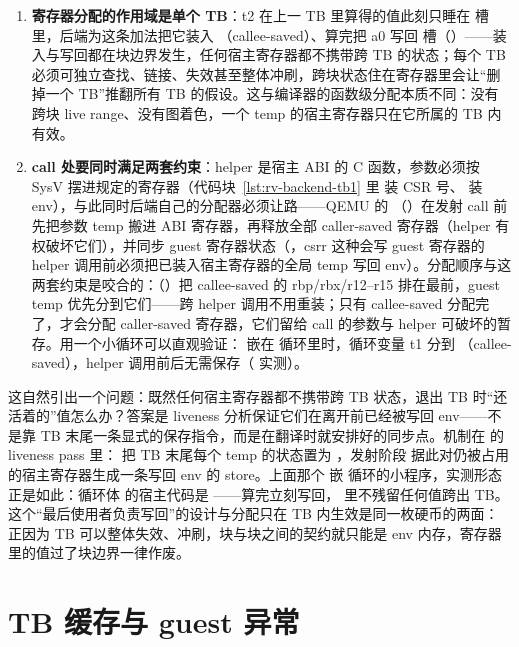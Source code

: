 \begin{enumerate}[label=\arabic*.,leftmargin=2.5em,itemsep=2pt]
\item \textbf{寄存器分配的作用域是单个 TB}：t2 在上一 TB 里算得的值此刻只睡在  槽里，后端为这条加法把它装入 （callee-saved）、算完把 a0 写回  槽（）——装入与写回都在块边界发生，任何宿主寄存器都不携带跨 TB 的状态；每个 TB 必须可独立查找、链接、失效甚至整体冲刷，跨块状态住在寄存器里会让“删掉一个 TB”推翻所有 TB 的假设。这与编译器的函数级分配本质不同：没有跨块 live range、没有图着色，一个 temp 的宿主寄存器只在它所属的 TB 内有效。
\item \textbf{call 处要同时满足两套约束}：helper 是宿主 ABI 的 C 函数，参数必须按 SysV 摆进规定的寄存器（代码块~\ref{lst:rv-backend-tb1} 里  装 CSR 号、 装 env），与此同时后端自己的分配器必须让路——QEMU 的 （）在发射 call 前先把参数 temp 搬进 ABI 寄存器，再释放全部 caller-saved 寄存器（helper 有权破坏它们），并同步 guest 寄存器状态（，csrr 这种会写 guest 寄存器的 helper 调用前必须把已装入宿主寄存器的全局 temp 写回 env）。分配顺序与这两套约束是咬合的：（）把 callee-saved 的 rbp/rbx/r12–r15 排在最前，guest temp 优先分到它们——跨 helper 调用不用重装；只有 callee-saved 分配完了，才会分配 caller-saved 寄存器，它们留给 call 的参数与 helper 可破坏的暂存。用一个小循环可以直观验证： 嵌在  循环里时，循环变量 t1 分到 （callee-saved），helper 调用前后无需保存（ 实测）。
\end{enumerate}

这自然引出一个问题：既然任何宿主寄存器都不携带跨 TB 状态，退出 TB 时“还活着的”值怎么办？答案是 liveness 分析保证它们在离开前已经被写回 env——不是靠 TB 末尾一条显式的保存指令，而是在翻译时就安排好的同步点。机制在  的 liveness pass 里： 把 TB 末尾每个 temp 的状态置为 ，发射阶段  据此对仍被占用的宿主寄存器生成一条写回 env 的 store。上面那个  嵌  循环的小程序，实测形态正是如此：循环体  的宿主代码是 ——算完立刻写回， 里不残留任何值跨出 TB。这个“最后使用者负责写回”的设计与分配只在 TB 内生效是同一枚硬币的两面：正因为 TB 可以整体失效、冲刷，块与块之间的契约就只能是 env 内存，寄存器里的值过了块边界一律作废。

\section{TB 缓存与 guest 异常}\label{sec:software-cpu-tb}

